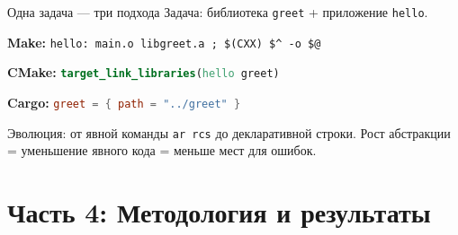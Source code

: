 \documentclass{beamer}
\newcommand{\progbar}[3]{%
\textcolor{#2}{\rule{#1}{4pt}}%
\hspace{2pt}%
\textcolor{halfgray}{\scriptsize #3}}
\begin{document}
\begin{frame}[fragile]{Одна задача — три подхода}
Задача: библиотека \texttt{greet} + приложение \texttt{hello}.

\small
\textbf{Make:}\qquad
\lstinline[language=Make]|hello: main.o libgreet.a ; $(CXX) $^ -o $@|

\textbf{CMake:}\qquad
\lstinline[language=CMake]|target_link_libraries(hello greet)|

\textbf{Cargo:}\qquad
\lstinline[language=TOML]|greet = { path = "../greet" }|

\normalsize
Эволюция: от явной команды \texttt{ar rcs} до декларативной строки.
Рост абстракции = уменьшение явного кода = меньше мест для ошибок.
\end{frame}

\section{Часть 4: Методология и результаты}

%

%
%
%
%
%
\end{document}
